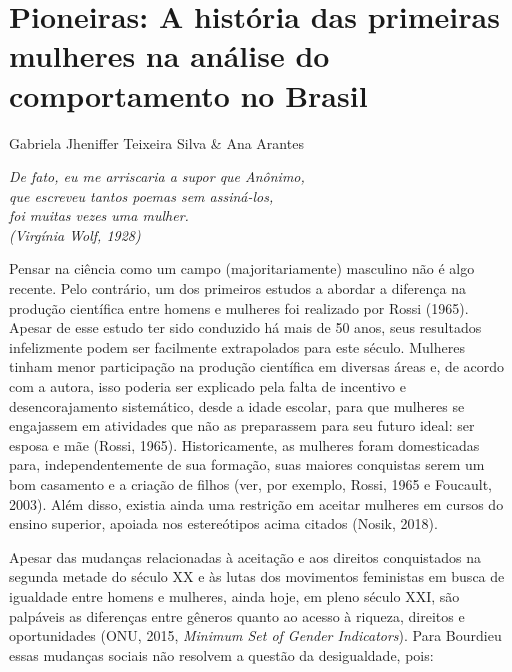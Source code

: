\chapter*{Pioneiras: A história das primeiras mulheres na análise do comportamento no Brasil}
\begin{flushright}
\begin{small}
Gabriela Jheniffer Teixeira Silva \& Ana Arantes
\end{small}
\vspace{1cm}

\emph{De fato, eu me arriscaria a supor que Anônimo,\\
que escreveu tantos poemas sem assiná-los,\\
foi muitas vezes uma mulher.\\
(Virgínia Wolf, 1928)}
\end{flushright}

Pensar na ciência como um campo (majoritariamente) masculino não é algo recente. Pelo contrário, um dos primeiros estudos a abordar a diferença na produção científica entre homens e mulheres foi realizado por Rossi (1965). Apesar de esse estudo ter sido conduzido há mais de 50 anos, seus resultados infelizmente podem ser facilmente extrapolados para este século. Mulheres tinham menor participação na produção científica em diversas áreas e, de acordo com a autora, isso poderia ser explicado pela falta de incentivo e desencorajamento sistemático, desde a idade escolar, para que mulheres se engajassem em atividades que não as preparassem para seu futuro ideal: ser esposa e mãe (Rossi, 1965). Historicamente, as mulheres foram domesticadas para, independentemente de sua formação, suas maiores conquistas serem um bom casamento e a criação de filhos (ver, por exemplo, Rossi, 1965 e Foucault, 2003). Além disso, existia ainda uma restrição em aceitar mulheres em cursos do ensino superior, apoiada nos estereótipos acima citados (Nosik, 2018).

Apesar das mudanças relacionadas à aceitação e aos direitos conquistados na segunda metade do século XX e às lutas dos movimentos feministas em busca de igualdade entre homens e mulheres, ainda hoje, em pleno século XXI, são palpáveis as diferenças entre gêneros quanto ao acesso à riqueza, direitos e oportunidades (ONU, 2015, \textit{Minimum Set of Gender Indicators}). Para Bourdieu essas mudanças sociais não resolvem a questão da desigualdade, pois:

